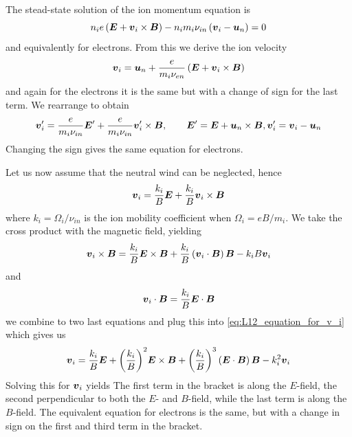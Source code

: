 The stead-state solution of the ion momentum equation is
\begin{equation*}
    n_{i}e\left(\boldsymbol{E}+\boldsymbol{v}_i\times\boldsymbol{B}\right)-n_{i}m_i\nu_{in}\left(\boldsymbol{v}_i-\boldsymbol{u}_n\right)=0
\end{equation*}
and equivalently for electrons. From this we derive the ion velocity
\begin{equation*}
    \boldsymbol{v}_i=\boldsymbol{u}_n+\frac{e}{m_i\nu_{en}}\left(\boldsymbol{E}+\boldsymbol{v}_i\times\boldsymbol{B}\right)
\end{equation*}
and again for the electrons it is the same but with a change of sign for the last term. We rearrange to obtain
\begin{equation*}
    \boldsymbol{v}_i'=\frac{e}{m_i\nu_{in}}\boldsymbol{E}'+\frac{e}{m_i\nu_{in}}\boldsymbol{v}_i'\times\boldsymbol{B},\qquad\boldsymbol{E}'=\boldsymbol{E}+\boldsymbol{u}_n\times\boldsymbol{B}, \boldsymbol{v}_i'=\boldsymbol{v}_i-\boldsymbol{u}_n
\end{equation*}
Changing the sign gives the same equation for electrons.

Let us now assume that the neutral wind can be neglected, hence
\begin{equation}\label{eq:L12_equation_for_v_i}
    \boldsymbol{v}_i=\frac{k_i}{B}\boldsymbol{E}+\frac{k_i}{B}\boldsymbol{v}_i\times\boldsymbol{B}
\end{equation}
where \(k_i=\Omega_i/\nu_{in}\) is the ion mobility coefficient when \(\Omega_i=eB/m_i\). We take the cross product with the magnetic field, yielding
\begin{equation*}
    \boldsymbol{v}_i\times\boldsymbol{B}=\frac{k_i}{B}\boldsymbol{E}\times\boldsymbol{B}+\frac{k_i}{B}\left(\boldsymbol{v}_i\cdot\boldsymbol{B}\right)\boldsymbol{B}-k_{i}B\boldsymbol{v}_i
\end{equation*}
and
\begin{equation*}
    \boldsymbol{v}_i\cdot\boldsymbol{B}=\frac{k_i}{B}\boldsymbol{E}\cdot\boldsymbol{B}
\end{equation*}
we combine to two last equations and plug this into \cref{eq:L12_equation_for_v_i} which gives us
\begin{equation*}
    \boldsymbol{v}_i=\frac{k_i}{B}\boldsymbol{E}+{\left(\frac{k_i}{B}\right)}^2\boldsymbol{E}\times\boldsymbol{B}+{\left(\frac{k_i}{B}\right)}^3\left(\boldsymbol{E}\cdot\boldsymbol{B}\right)\boldsymbol{B}-k_i^2\boldsymbol{v}_i
\end{equation*}
Solving this for \(\boldsymbol{v}_i\) yields
The first term in the bracket is along the \(E\)-field, the second perpendicular to both the \(E\)- and \(B\)-field, while the last term is along the \(B\)-field. The equivalent equation for electrons is the same, but with a change in sign on the first and third term in the bracket.

